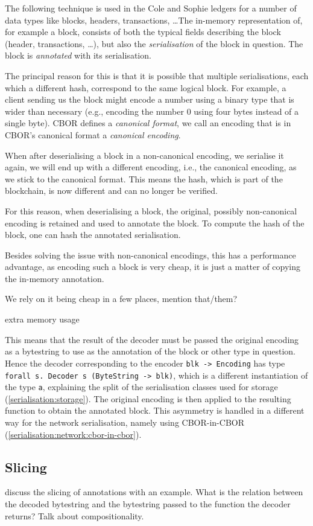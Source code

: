 The following technique is used in the Cole and Sophie ledgers for a number of
data types like blocks, headers, transactions, \ldots The in-memory representation
of, for example a block, consists of both the typical fields describing the
block (header, transactions, \ldots), but also the \emph{serialisation} of the block
in question. The block is \emph{annotated} with its serialisation.

The principal reason for this is that it is possible that multiple
serialisations, each which a different hash, correspond to the same logical
block. For example, a client sending us the block might encode a number using a
binary type that is wider than necessary (e.g., encoding the number 0 using four
bytes instead of a single byte). CBOR defines a \emph{canonical format}, we call
an encoding that is in CBOR's canonical format a \emph{canonical
encoding}.

When after deserialising a block in a non-canonical encoding, we serialise it
again, we will end up with a different encoding, i.e., the canonical encoding,
as we stick to the canonical format. This means the hash, which is part of the
blockchain, is now different and can no longer be verified.

For this reason, when deserialising a block, the original, possibly
non-canonical encoding is retained and used to annotate the block. To compute
the hash of the block, one can hash the annotated serialisation.

Besides solving the issue with non-canonical encodings, this has a performance
advantage, as encoding such a block is very cheap, it is just a matter of
copying the in-memory annotation.

 We rely on it being cheap in a few places, mention that/them?

 extra memory usage

This means that the result of the decoder must be passed the original encoding
as a bytestring to use as the annotation of the block or other type in question.
Hence the decoder corresponding to the encoder \lstinline!blk -> Encoding! has
type \lstinline!forall s. Decoder s (ByteString -> blk)!, which is a different
instantiation of the type \lstinline!a!, explaining the split of the
serialisation classes used for storage (\cref{serialisation:storage}). The
original encoding is then applied to the resulting function to obtain the
annotated block. This asymmetry is handled in a different way for the network
serialisation, namely using CBOR-in-CBOR
(\cref{serialisation:network:cbor-in-cbor}).

\subsection{Slicing}

 discuss the slicing of annotations with an example. What is the
relation between the decoded bytestring and the bytestring passed to the
function the decoder returns? Talk about compositionality.
